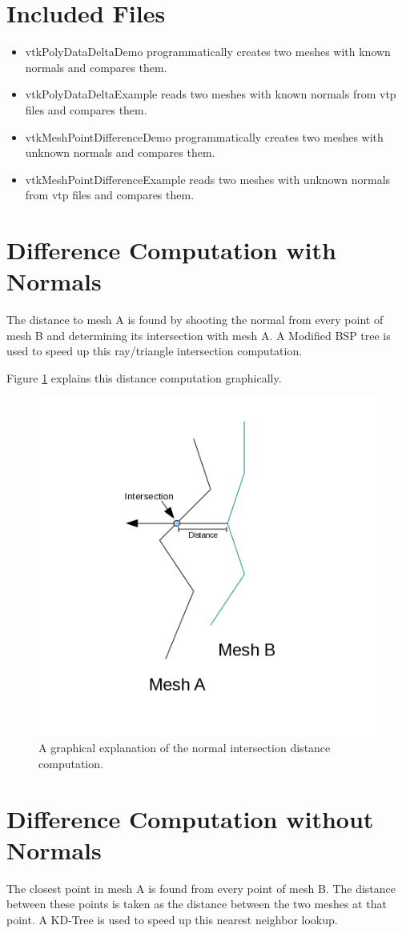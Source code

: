 \documentclass{ComputationalAlgorithmsArticle}
\begin{document}
\section{Included Files}
\begin{itemize}
\item vtkPolyDataDeltaDemo programmatically creates two meshes with known normals and compares them.
\item vtkPolyDataDeltaExample reads two meshes with known normals from vtp files and compares them.
\item vtkMeshPointDifferenceDemo programmatically creates two meshes with unknown normals and compares them.
\item vtkMeshPointDifferenceExample reads two meshes with unknown normals from vtp files and compares them.
\end{itemize}


\section{Difference Computation with Normals}
The distance to mesh A is found by shooting the normal from every point of mesh B and determining its intersection with mesh A. A Modified BSP tree is used to speed up this ray/triangle intersection computation.

Figure \ref{fig:RayIntersection} explains this distance computation graphically.

\begin{figure}[H]
  \centering
  \includegraphics[width=0.5\linewidth]{images/RayIntersection}
  \caption{A graphical explanation of the normal intersection distance computation.}
  \label{fig:RayIntersection}
\end{figure}

\section{Difference Computation without Normals}
The closest point in mesh A is found from every point of mesh B. The distance between these points is taken as the distance between the two meshes at that point. A KD-Tree is used to speed up this nearest neighbor lookup.
\end{document}
